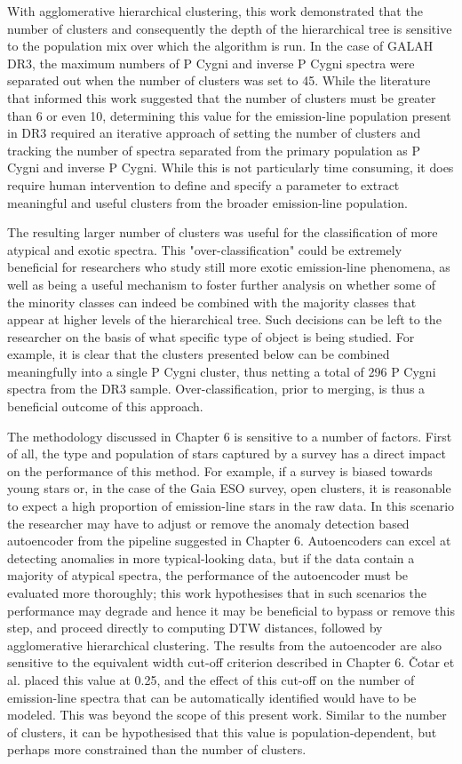With agglomerative hierarchical clustering, this work demonstrated that the number of clusters and consequently the depth of the hierarchical tree is sensitive to the population mix over which the algorithm is run. In the case of GALAH DR3, the maximum numbers of P Cygni and inverse P Cygni spectra were separated out when the number of clusters was set to 45. While the literature that informed this work suggested that the number of clusters must be greater than 6 or even 10, determining this value for the emission-line population present in DR3 required an iterative approach of setting the number of clusters and tracking the number of spectra separated from the primary population as P Cygni and inverse P Cygni. While this is not particularly time consuming, it does require human intervention to define and specify a parameter to extract meaningful and useful clusters from the broader emission-line population. 

The resulting larger number of clusters was useful for the classification of more atypical and exotic spectra. This "over-classification" could be extremely beneficial for researchers who study still more exotic emission-line phenomena, as well as being a useful mechanism to foster further analysis on whether some of the minority classes can indeed be combined with the majority classes that appear at higher levels of the hierarchical tree. Such decisions can be left to the researcher on the basis of what specific type of object is being studied. For example, it is clear that the clusters presented below can be combined meaningfully into a single P Cygni cluster, thus netting a total of 296 P Cygni spectra from the DR3 sample. Over-classification, prior to merging, is thus a beneficial outcome of this approach. 

The methodology discussed in Chapter 6 is sensitive to a number of factors. First of all, the type and population of stars captured by a survey has a direct impact on the performance of this method. For example, if a survey is biased towards young stars or, in the case of the Gaia ESO survey, open clusters, it is reasonable to expect a high proportion of emission-line stars in the raw data. In this scenario the researcher may have to adjust or remove the anomaly detection based autoencoder from the pipeline suggested in Chapter 6. Autoencoders can excel at detecting anomalies in more typical-looking data, but if the data contain a majority of atypical spectra, the performance of the autoencoder must be evaluated more thoroughly; this work hypothesises that in such scenarios the performance may degrade and hence it may be beneficial to bypass or remove this step, and proceed directly to computing DTW distances, followed by agglomerative hierarchical clustering. The results from the autoencoder are also sensitive to the equivalent width cut-off criterion described in Chapter 6. Čotar et al. placed this value at 0.25, and the effect of this cut-off on the number of emission-line spectra that can be automatically identified would have to be modeled. This was beyond the scope of this present work. Similar to the number of clusters, it can be hypothesised that this value is population-dependent, but perhaps more constrained than the number of clusters.

